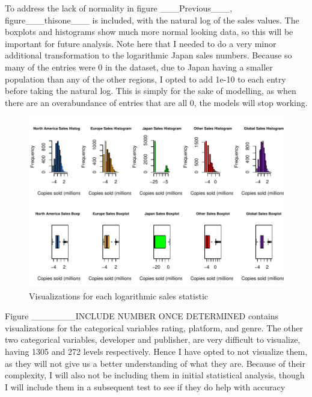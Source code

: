 \documentclass[12pt]{article}
\begin{document}
To address the lack of normality in figure ___Previous___, figure___thisone___ is included, with the natural log of the sales values.
The boxplots and histograms show much more normal looking data, so this will be important for future analysis. 
Note here that I needed to do a very minor additional transformation to the logarithmic Japan sales numbers. Because so many of the entries
were 0 in the dataset, due to Japan having a smaller population than any of the other regions, I opted to add 1e-10 to each entry before taking
the natural log. This is simply for the sake of modelling, as when there are an overabundance of entries that are all 0, the models will stop working.

\begin{figure}[tbp]
  \centering
  \includegraphics[width=\textwidth]{histandboxlogs.pdf}
  \caption{Visualizations for each logarithmic sales statistic}
  \label{fig:histandboxlogs}
\end{figure}


Figure _______INCLUDE NUMBER ONCE DETERMINED contains visualizations for the categorical variables rating, platform, and genre.
The other two categorical variables, developer and publisher, are very difficult to visualize, having 1305 and 272 levels respectively.
Hence I have opted to not visualize them, as they will not give us a better understanding of what they are. Because of their complexity, 
I will also not be including them in initial statistical analysis, though I will include them in a subsequent test to see if they do 
help with accuracy
\end{document}
